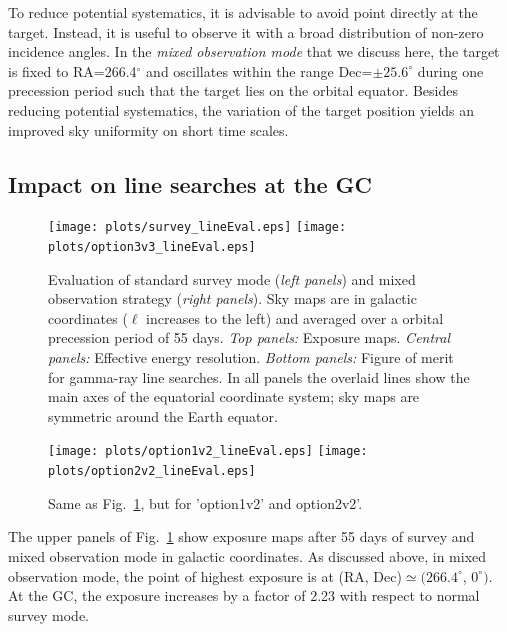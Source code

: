 \documentclass[aps,prd,superscriptaddress,showpacs,nofootinbib,fixlfloat, 12pt]{revtex4-1}
\begin{document}
To reduce potential systematics, it is advisable to avoid point directly at
the target. Instead, it is useful to observe it with a broad distribution of
non-zero incidence angles. In the \emph{mixed observation mode} that we
discuss here, the target is fixed to RA=266.4$^\circ$ and oscillates within
the range Dec=$\pm25.6^\circ$ during one precession period such that the
target lies on the orbital equator. Besides reducing potential systematics,
the variation of the target position yields an improved sky uniformity on
short time scales. 

\subsection{Impact on line searches at the GC}

\begin{figure}[t]
  \begin{center}
    \texttt{[image: plots/survey\_lineEval.eps]}
    \texttt{[image: plots/option3v3\_lineEval.eps]}
    \vspace{-0.5cm}
  \end{center}
  \caption{Evaluation of standard survey mode (\emph{left panels}) and mixed observation
    strategy (\emph{right panels}). Sky maps are in galactic coordinates ($\ell$ increases
    to the left) and averaged over a orbital precession period of 55 days.
    \emph{Top
      panels:} Exposure maps.
    \emph{Central panels:}
    Effective energy resolution.
  \emph{Bottom panels:} Figure of merit for gamma-ray line searches. In all
  panels the overlaid lines show the main axes of the equatorial coordinate
  system; sky maps are symmetric around the Earth equator.}
  \label{fig:mollweide}
\end{figure}

\begin{figure}[t]
  \begin{center}
    \texttt{[image: plots/option1v2\_lineEval.eps]}
    \texttt{[image: plots/option2v2\_lineEval.eps]}
    \vspace{-0.5cm}
  \end{center}
  \caption{Same as Fig.~\ref{fig:mollweide}, but for 'option1v2' and
  option2v2'.}
  \label{fig:mollweide2}
\end{figure}

The upper panels of Fig.~\ref{fig:mollweide} show exposure maps after 55 days
of survey and mixed observation mode in galactic coordinates. As discussed
above, in mixed
observation mode, the point of highest exposure is at (RA,
Dec)$\simeq(266.4^\circ$, $0^\circ)$. At the GC, the exposure
increases by a factor of 2.23 with respect to normal survey mode.
\end{document}
